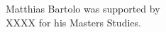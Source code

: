 \pagebreak
\vspace*{\fill}


\begin{center}
    {\large\vspace*{10mm} Matthias Bartolo was supported by \\ XXXX for his Masters Studies. }\par %
\end{center}

\vspace*{\fill}